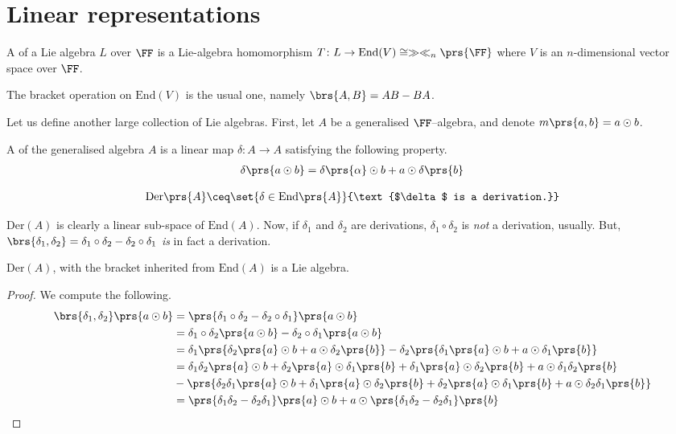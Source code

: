 \documentclass[10pt,a4paper,twoside,openany,hidelinks]{book}
\begin{document}
\section{Linear representations}
\begin{definition}
A  of a Lie algebra $L$ over $\FF$ is a Lie-algebra homomorphism $T \colon L \to \mathrm{End}(V) \cong \gg \ll_n\prs{\FF}$ where $V$ is an $n$-dimensional vector space over $\FF$.
\end{definition}
\begin{remark}
The bracket operation on $\mathrm{End}(V)$ is the usual one, namely $\brs{A,B} = AB - BA$.
\end{remark}
Let us define another large collection of Lie algebras. First, let $A$ be a generalised $\FF$–algebra, and denote $m\prs{a,b} = a \odot b$.\\
\begin{definition}
A  of the generalised algebra $A$ is a linear map $\delta \colon A \to A$ satisfying the following property.
\begin{align*}
\delta \prs{ a \odot b} = \delta\prs{\alpha} \odot b + a \odot \delta\prs{b}
\end{align*}
\end{definition}
\begin{definition}
\[\mathrm{Der}\prs{A} \ceq \set{\delta \in \mathrm{End}\prs{A}}{\text{$\delta$ is a derivation.}}\]
\end{definition}
\begin{remark}
$\mathrm{Der}(A)$ is clearly a linear sub-space of $\mathrm{End}(A)$.
Now, if $\delta_1$ and $\delta_2$ are derivations, $\delta_1 \circ \delta_2$ is \emph{not} a derivation, usually.
But, $\brs{\delta_1, \delta_2} = \delta_1 \circ \delta_2 - \delta_2 \circ \delta_1$ \emph{is} in fact a derivation.
\end{remark}
\begin{conclusion}
$\mathrm{Der}(A)$, with the bracket inherited from $\mathrm{End}(A)$ is a Lie algebra.
\end{conclusion}
\begin{proof}
We compute the following.
\begin{align*}
\brs{\delta_1, \delta_2}\prs{a \odot b} &= \prs{\delta_1 \circ \delta_2 - \delta_2 \circ \delta_1}\prs{a \odot b} \\
&= \delta_1 \circ \delta_2\prs{a \odot b} - \delta_2 \circ \delta_1 \prs{a \odot b} \\
&= \delta_1 \prs{\delta_2\prs{a}\odot b + a\odot \delta_2\prs{b}} - \delta_2 \prs{\delta_1\prs{a}\odot b + a\odot\delta_1\prs{b}} \\
&= \delta_1 \delta_2 \prs{a} \odot b + \delta_2\prs{a} \odot \delta_1\prs{b} + \delta_1\prs{a}\odot \delta_2\prs{b} + a\odot \delta_1\delta_2\prs{b} \\ &- \prs{\delta_2 \delta_1\prs{a} \odot b + \delta_1 \prs{a} \odot \delta_2 \prs{b} + \delta_2\prs{a} \odot \delta_1\prs{b} + a\odot \delta_2 \delta_1\prs{b}} \\
&= \prs{\delta_1 \delta_2 - \delta_2 \delta_1} \prs{a} \odot b + a\odot \prs{\delta_1 \delta_2 - \delta_2 \delta_1}\prs{b}
\end{align*}
\end{proof}
\end{document}
